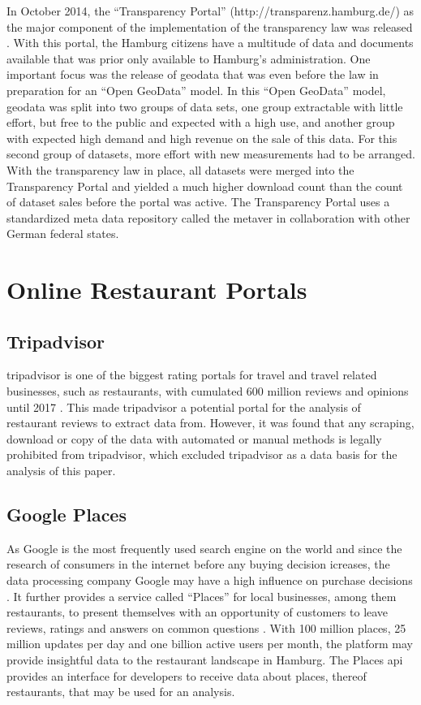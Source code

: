 \documentclass[a4paper, 11pt, oneside]{Thesis}  %
\begin{document}
In October 2014, the ``Transparency Portal'' (http://transparenz.hamburg.de/) as the major component of the implementation of the transparency law was released \cite{Murjahn.2016}. With this portal, the Hamburg citizens have a multitude of data and documents available that was prior only available to Hamburg's administration. One important focus was the release of geodata that was even before the law in preparation for an ``Open GeoData'' model. In this ``Open GeoData'' model, geodata was split into two groups of data sets, one group extractable with little effort, but free to the public and expected with a high use, and another group with expected high demand and high revenue on the sale of this data. For this second group of datasets, more effort with new measurements had to be arranged. With the transparency law in place, all datasets were merged into the Transparency Portal and yielded a much higher download count than the count of dataset sales before the portal was active. The Transparency Portal uses a standardized meta data repository called the \ac{metaver} in collaboration with other German federal states.

\section{Online Restaurant Portals}

\subsection{Tripadvisor}

tripadvisor is one of the biggest rating portals for travel and travel related businesses, such as restaurants, with cumulated 600 million reviews and opinions until 2017 \cite{StephenKaufer.27.04.2018}. This made tripadvisor a potential portal for the analysis of restaurant reviews to extract data from. However, it was found that any scraping, download or copy of the data with automated or manual methods is legally prohibited from tripadvisor, which excluded tripadvisor as a data basis for the analysis of this paper.

\subsection{Google Places}

As Google is the most frequently used search engine on the world and since the research of consumers in the internet before any buying decision icreases, the data processing company Google may have a high influence on purchase decisions \cite{Zhao.2018} \cite{Shim.2001}. It further provides a service called ``Places'' for local businesses, among them restaurants, to present themselves with an opportunity of customers to leave reviews, ratings and answers on common questions \cite{GooglePlaces}. With 100 million places, 25 million updates per day and one billion active users per month, the platform may provide insightful data to the restaurant landscape in Hamburg. The Places \ac{api} provides an interface for developers to receive data about places, thereof restaurants, that may be used for an analysis. 
\end{document}
